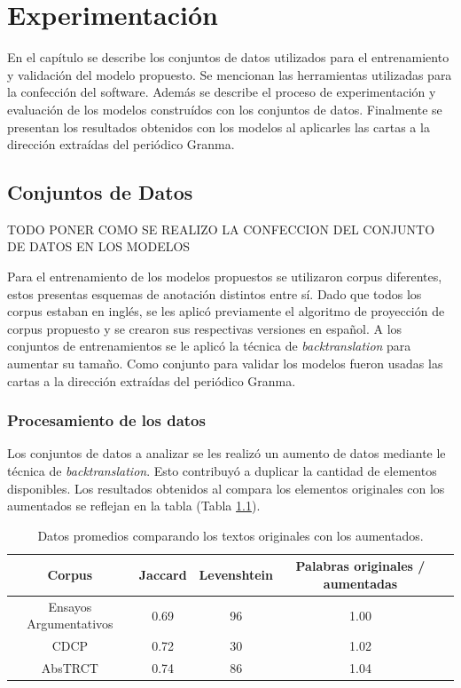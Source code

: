 \chapter{Experimentación}\label{chapter:implementation}

En el capítulo se describe los conjuntos de datos utilizados para el entrenamiento y validación del modelo 
propuesto. Se mencionan las herramientas utilizadas para la confección del software. Además se describe el 
proceso de experimentación y evaluación de los modelos construídos con los conjuntos de datos. Finalmente
se presentan los resultados obtenidos con los modelos al aplicarles las cartas a la dirección extraídas 
del periódico Granma. 

\section{Conjuntos de Datos}

TODO PONER COMO SE REALIZO LA CONFECCION DEL CONJUNTO DE DATOS EN LOS MODELOS

Para el entrenamiento de los modelos propuestos se utilizaron corpus diferentes, estos
presentas esquemas de anotación distintos entre sí. Dado que todos los corpus estaban en inglés, 
se les aplicó previamente el algoritmo de proyección de corpus propuesto y se crearon sus respectivas
versiones en español. A los conjuntos de entrenamientos se le aplicó la técnica de \emph{backtranslation}
para aumentar su tamaño. Como conjunto para validar los modelos fueron usadas las cartas a la dirección
extraídas del periódico Granma.

\subsection{Procesamiento de los datos}

Los conjuntos de datos a analizar se les realizó un aumento de datos mediante le técnica de \emph{backtranslation}.
Esto contribuyó a duplicar la cantidad de elementos disponibles. Los resultados obtenidos al compara los 
elementos originales con los aumentados se reflejan en la tabla (Tabla \ref{table:data_augmentation}).

\begin{table}[h!]
	\begin{center}
		\begin{tabular}{|c|c|c|c|c|} \hline
		Corpus		            &  Jaccard	& Levenshtein	& Palabras originales / aumentadas   \\ \hline
        Ensayos Argumentativos	&  0.69		                & 96		                    & 1.00	  \\ \hline
		CDCP                    &  0.72	                    & 30		                    & 1.02	  \\ \hline
        AbsTRCT                 &  0.74		                & 86		                    & 1.04	  \\ \hline
		\end{tabular}
	\caption{Datos promedios comparando los textos originales con los aumentados.}\label{table:data_augmentation}
	\end{center}
\end{table}

